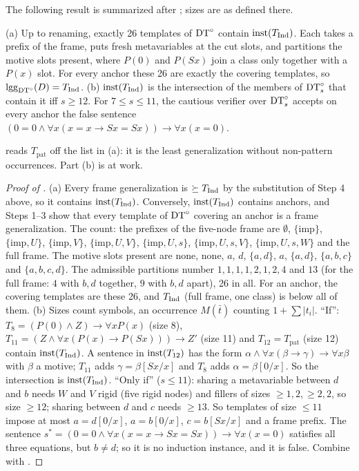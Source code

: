The following result is summarized after ; sizes are as defined there.

\begin{proposition}\label{prop:zf:indgen}
(a) Up to renaming, exactly 26 templates of $\mathrm{DT}^{\circ}$ contain $\mathrm{inst}(T_{\mathrm{Ind}})$. Each takes a prefix of the frame, puts
fresh metavariables at the cut slots, and partitions the motive slots present, where $P(0)$ and $P(Sx)$ join a class
only together with a $P(x)$ slot. For every anchor these 26 are exactly the covering templates, so
$\mathrm{lgg}_{\mathrm{DT}^{\circ}}(D)=T_{\mathrm{Ind}}$.
(b) $\mathrm{inst}(T_{\mathrm{Ind}})$ is the intersection of the members of $\mathrm{DT}^{\circ}_s$ that contain it iff $s\ge12$. For $7\le s\le11$,
the cautious verifier over $\mathrm{DT}^{\circ}_s$ accepts on every anchor the false sentence
$(0=0\wedge\forall x(x=x\to Sx=Sx))\to\forall x(x=0)$.
\end{proposition}
 reads $T_{\mathrm{pat}}$ off the list in (a): it is the least generalization without
non-pattern occurrences. Part (b) is  at work.

\begin{proof}[Proof of ]
(a) Every frame generalization is $\succeq T_{\mathrm{Ind}}$ by the substitution of Step 4 above, so it contains $\mathrm{inst}(T_{\mathrm{Ind}})$.
Conversely, $\mathrm{inst}(T_{\mathrm{Ind}})$ contains anchors, and Steps 1--3 show that every template of $\mathrm{DT}^{\circ}$ covering an anchor is a
frame generalization. The count: the prefixes of the five-node frame are $\emptyset$, $\{\mathrm{imp}\}$, $\{\mathrm{imp},U\}$,
$\{\mathrm{imp},V\}$, $\{\mathrm{imp},U,V\}$, $\{\mathrm{imp},U,s\}$, $\{\mathrm{imp},U,s,V\}$, $\{\mathrm{imp},U,s,W\}$ and the
full frame. The motive slots present are none, none, $a$, $d$, $\{a,d\}$, $a$, $\{a,d\}$, $\{a,b,c\}$ and $\{a,b,c,d\}$.
The admissible partitions number $1,1,1,1,2,1,2,4$ and $13$ (for the full frame: $4$ with $b,d$ together, $9$ with $b,d$
apart), 26 in all. For an anchor, the covering templates are these 26, and $T_{\mathrm{Ind}}$ (full frame, one class) is below all
of them.
(b) Sizes count symbols, an occurrence $M(\bar t)$ counting $1+\sum|t_i|$. ``If'': $T_8=(P(0)\wedge Z)\to\forall
xP(x)$ (size 8), $T_{11}=(Z\wedge\forall x(P(x)\to P(Sx)))\to Z'$ (size 11) and $T_{12}=T_{\mathrm{pat}}$ (size 12)
contain $\mathrm{inst}(T_{\mathrm{Ind}})$. A sentence in $\mathrm{inst}(T_{12})$ has the form $\alpha\wedge\forall x(\beta\to\gamma)\to\forall
x\beta$ with $\beta$ a motive; $T_{11}$ adds $\gamma=\beta[Sx/x]$ and $T_8$ adds $\alpha=\beta[0/x]$. So the intersection
is $\mathrm{inst}(T_{\mathrm{Ind}})$. ``Only if'' ($s\le11$): sharing a metavariable between $d$ and $b$ needs $W$ and $V$ rigid (five
rigid nodes) and fillers of sizes $\ge1,2,\ge2,2$, so size $\ge12$; sharing between $d$ and $c$ needs $\ge13$. So templates
of size $\le11$ impose at most $a=d[0/x]$, $a=b[0/x]$, $c=b[Sx/x]$ and a frame prefix. The sentence
$s^*=(0=0\wedge\forall x(x=x\to Sx=Sx))\to\forall x(x=0)$ satisfies all three equations, but $b\ne d$; so it is no
induction instance, and it is false. Combine with .
\end{proof}

